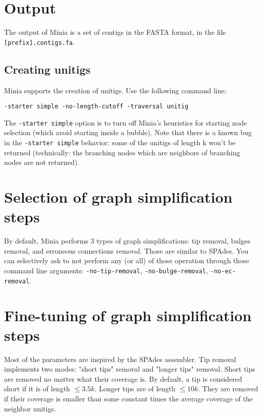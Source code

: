 \documentclass[a4paper]{article}
\begin{document}
\section{Output}

The output of Minia is a set of contigs in the FASTA format, in the file \verb+[prefix].contigs.fa+. 

\subsection*{Creating unitigs}

Minia supports the creation of unitigs. Use the following command line: 
\begin{verbatim}
-starter simple -no-length-cutoff -traversal unitig
\end{verbatim}

The \verb+-starter simple+ option is to turn off Minia's heuristics for starting node selection (which avoid starting inside a bubble).
Note that there is a known bug in the \verb+-starter simple+ behavior: some of the unitigs of length k won't be returned (technically: the branching nodes which are neighbors of branching nodes are not returned).

\section{Selection of graph simplification steps}

By default, Minia performs 3 types of graph simplifications: tip removal, bulges removal, and erroneous connections removal. Those are similar to SPAdes. You can selectively ask to not perform any (or all) of those operation through those command line arguments: \verb+-no-tip-removal+, \verb+-no-bulge-removal+, \verb+-no-ec-removal+.

\section{Fine-tuning of graph simplification steps}

Most of the parameters are inspired by the SPAdes assembler.
Tip removal implements two modes: "short tips" removal and "longer tips" removal. Short tips are removed no matter what their coverage is. By default, a tip is considered short if it is of length $\leq 3.5k$. Longer tips are of length $\leq 10k$. They are removed if their coverage is smaller than some constant times the average coverage of the neighbor unitigs.
\end{document}
